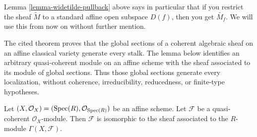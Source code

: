\noindent
Lemma \ref{lemma-widetilde-pullback} above says in particular
that if you restrict
the sheaf $\widetilde M$ to a standard affine open subspace
$D(f)$, then you get $\widetilde{M_f}$. We will use this from
now on without further mention.

\begin{lemma}
\label{lemma-quasi-coherent-affine}
\begin{reference}
\cite[Chapter II, \S 3, no. 45, Theorem 2, pp. 237--238]{FAC}
\end{reference}
\begin{history}
The cited theorem proves that the global sections of a coherent algebraic
sheaf on an affine classical variety generate every stalk. The lemma below
identifies an arbitrary quasi-coherent module on an affine scheme with the
sheaf associated to its module of global sections. Thus those global sections
generate every localization, without coherence, irreducibility, reducedness,
or finite-type hypotheses.
\end{history}
Let $(X, \mathcal{O}_X) = (\mathop{\mathrm{Spec}}(R), \mathcal{O}_{\mathop{\mathrm{Spec}}(R)})$
be an affine scheme. Let $\mathcal{F}$ be a
quasi-coherent $\mathcal{O}_X$-module. Then
$\mathcal{F}$ is isomorphic to the sheaf associated to
the $R$-module $\Gamma(X, \mathcal{F})$.
\end{lemma}

